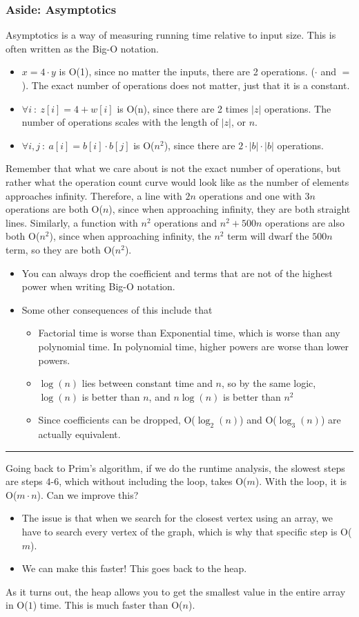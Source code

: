 \documentclass[10pt]{article}
\begin{document}
\subsubsection*{Aside: Asymptotics}
Asymptotics is a way of measuring running time relative to input size.  This is often written as the Big-O notation.
\begin{itemize}
	\item $x = 4 \cdot y$ is O(1), since no matter the inputs, there are 2 operations.  ($\cdot$ and $=$).  The exact number of operations does not matter, just that it is a constant.
	\item $\forall i \::\: z[i] = 4 + w[i]$ is O(n), since there are 2 times $|z|$ operations.  The number of operations scales with the length of $|z|$, or $n$.
	\item $\forall i, j \::\: a[i] = b[i] \cdot b[j]$ is O($n^2$), since there are $2 \cdot |b| \cdot |b|$ operations.
\end{itemize}
Remember that what we care about is not the exact number of operations, but rather what the operation count curve would look like as the number of elements approaches infinity.  Therefore, a line with $2n$ operations and one with $3n$ operations are both O($n$), since when approaching infinity, they are both straight lines.  Similarly, a function with $n^2$ operations and $n^2 + 500n$ operations are also both O($n^2$), since when approaching infinity, the $n^2$ term will dwarf the $500n$ term, so they are both O($n^2$).
\begin{itemize}
	\item You can always drop the coefficient and terms that are not of the highest power when writing Big-O notation.
	\item Some other consequences of this include that 
	\begin{itemize}
	    \item Factorial time is worse than Exponential time, which is worse than any polynomial time.  In polynomial time, higher powers are worse than lower powers.  
        \item $\log(n)$ lies between constant time and $n$, so by the same logic, $\log(n)$ is better than $n$, and $n\log(n)$ is better than $n^2$
        \item Since coefficients can be dropped, O($\log_2(n)$) and O($\log_3(n)$) are actually equivalent.
    \end{itemize}
\end{itemize}
\rule{\textwidth}{0.4pt}
Going back to Prim's algorithm, if we do the runtime analysis, the slowest steps are steps 4-6, which without including the loop, takes O($m$).  With the loop, it is O($m \cdot n$).  Can we improve this?
\begin{itemize}
	\item The issue is that when we search for the closest vertex using an array, we have to search every vertex of the graph, which is why that specific step is O($m$).  
	\item We can make this faster!  This goes back to the heap.
\end{itemize}
As it turns out, the heap allows you to get the smallest value in the entire array in O($1$) time.  This is much faster than O($n$).
\end{document}
